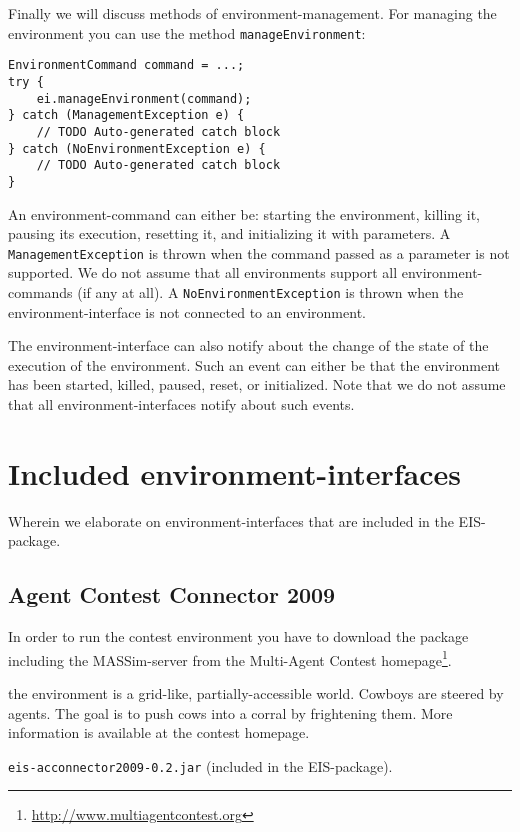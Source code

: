 \documentclass[a4]{article}
\newcommand{\EIS}{\textsf{EIS}\xspace}
\begin{document}
Finally we will discuss methods of environment-management. For managing the environment you can use
the method \texttt{manageEnvironment}:
\begin{verbatim}
EnvironmentCommand command = ...; 
try {
    ei.manageEnvironment(command);
} catch (ManagementException e) {
    // TODO Auto-generated catch block
} catch (NoEnvironmentException e) {
    // TODO Auto-generated catch block
}
\end{verbatim}
An environment-command can either be: starting the environment, killing it, pausing its execution, resetting it, and
initializing it with parameters. A \texttt{ManagementException} is thrown when the command passed as a parameter
is not supported. We do not assume that all environments support all environment-commands (if any at all). 
A \texttt{NoEnvironmentException} is thrown when the environment-interface is not connected to an environment.

The environment-interface can also notify about the change of the state of the execution of the environment.
Such an event can either be that the environment has been started, killed, paused, reset, or initialized.
Note that we do not assume that all environment-interfaces notify about such events.

\section{Included environment-interfaces}

Wherein we elaborate on environment-interfaces that are included in the \EIS-package.

\subsection{Agent Contest Connector 2009}

In order to run the contest environment you have to download the package including the MASSim-server from
the Multi-Agent Contest homepage\footnote{\url{http://www.multiagentcontest.org}}. 

\medskip{} the environment is a grid-like, partially-accessible world. Cowboys are steered
by agents. The goal is to push cows into a corral by frightening them. More information is available at the 
contest homepage.

\medskip{} \texttt{eis-acconnector2009-0.2.jar} (included in the \EIS-package).
\end{document}
